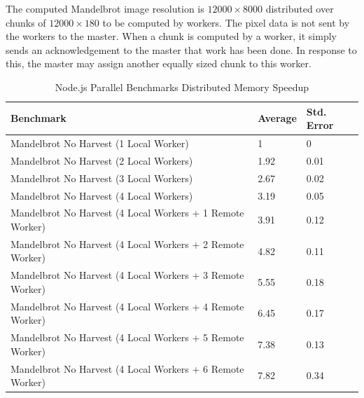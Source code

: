 \documentclass[oneside]{um-fict}
\begin{document}
The computed Mandelbrot image resolution is $12000 \times 8000$ distributed over chunks of $12000 \times 180$ to be computed by workers. The pixel data is not sent by the workers to the master. When a chunk is computed by a worker, it simply sends an acknowledgement to the master that work has been done. In response to this, the master may assign another equally sized chunk to this worker.
\begin{table}[H]
    \begin{center}
        \begin{tabular}{|l|ll|}
            \hline
            Benchmark                                                   & Average & Std. Error \\ \hline
            Mandelbrot No Harvest (1 Local Worker)                      & 1       & 0              \\
            Mandelbrot No Harvest (2 Local Workers)                     & 1.92    & 0.01           \\
            Mandelbrot No Harvest (3 Local Workers)                     & 2.67    & 0.02           \\
            Mandelbrot No Harvest (4 Local Workers)                     & 3.19    & 0.05           \\
            Mandelbrot No Harvest (4 Local Workers + 1 Remote Worker) & 3.91    & 0.12           \\
            Mandelbrot No Harvest (4 Local Workers + 2 Remote Worker) & 4.82    & 0.11           \\
            Mandelbrot No Harvest (4 Local Workers + 3 Remote Worker) & 5.55    & 0.18           \\
            Mandelbrot No Harvest (4 Local Workers + 4 Remote Worker) & 6.45    & 0.17            \\
            Mandelbrot No Harvest (4 Local Workers + 5 Remote Worker) & 7.38    & 0.13            \\
            Mandelbrot No Harvest (4 Local Workers + 6 Remote Worker) & 7.82    & 0.34           \\ \hline
        \end{tabular}
        \caption{Node.js Parallel Benchmarks Distributed Memory Speedup}\label{tab:nodedistributedmemoryspeedup}
    \end{center}
\end{table}
\end{document}
